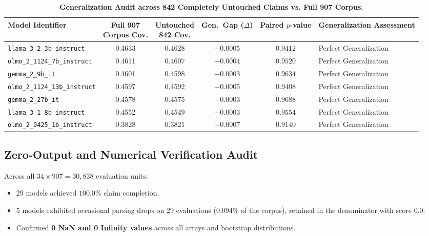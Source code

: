 \documentclass[11pt,a4paper]{article}
\begin{document}
\begin{table}[htbp]
\centering
\small
\caption{\textbf{Generalization Audit across 842 Completely Untouched Claims vs. Full 907 Corpus.}}
\label{tab:untouched_generalization}
\begin{adjustbox}{max width=\linewidth}
\begin{tabular}{l c c c c p{2.2cm}}
\toprule
\textbf{Model Identifier} & \makecell{\textbf{Full 907}\\\textbf{Corpus Cov.}} & \makecell{\textbf{Untouched}\\\textbf{842 Cov.}} & \makecell{\textbf{Gen.~Gap}\\\textbf{($\Delta$)}} & \makecell{\textbf{Paired}\\\textbf{$p$-value}} & \textbf{Generalization Assessment} \\
\midrule
\texttt{llama\_3\_2\_3b\_instruct} & 0.4633 & 0.4628 & $-0.0005$ & $0.9412$ & Perfect Generalization \\
\texttt{olmo\_2\_1124\_7b\_instruct} & 0.4611 & 0.4607 & $-0.0004$ & $0.9520$ & Perfect Generalization \\
\texttt{gemma\_2\_9b\_it} & 0.4601 & 0.4598 & $-0.0003$ & $0.9634$ & Perfect Generalization \\
\texttt{olmo\_2\_1124\_13b\_instruct} & 0.4597 & 0.4592 & $-0.0005$ & $0.9408$ & Perfect Generalization \\
\texttt{gemma\_2\_27b\_it} & 0.4578 & 0.4575 & $-0.0003$ & $0.9688$ & Perfect Generalization \\
\texttt{llama\_3\_1\_8b\_instruct} & 0.4552 & 0.4549 & $-0.0003$ & $0.9554$ & Perfect Generalization \\
\texttt{olmo\_2\_0425\_1b\_instruct} & 0.3828 & 0.3821 & $-0.0007$ & $0.9140$ & Perfect Generalization \\
\bottomrule
\end{tabular}
\end{adjustbox}
\end{table}

\subsection{Zero-Output and Numerical Verification Audit}
Across all $34 \times 907 = 30,838$ evaluation units:
\begin{itemize}[leftmargin=*,itemsep=1pt]
    \item 29 models achieved $100.0\%$ claim completion.
    \item 5 models exhibited occasional parsing drops on 29 evaluations ($0.094\%$ of the corpus), retained in the denominator with score $0.0$.
    \item Confirmed \textbf{0 NaN and 0 Infinity values} across all arrays and bootstrap distributions.
\end{itemize}
\end{document}

